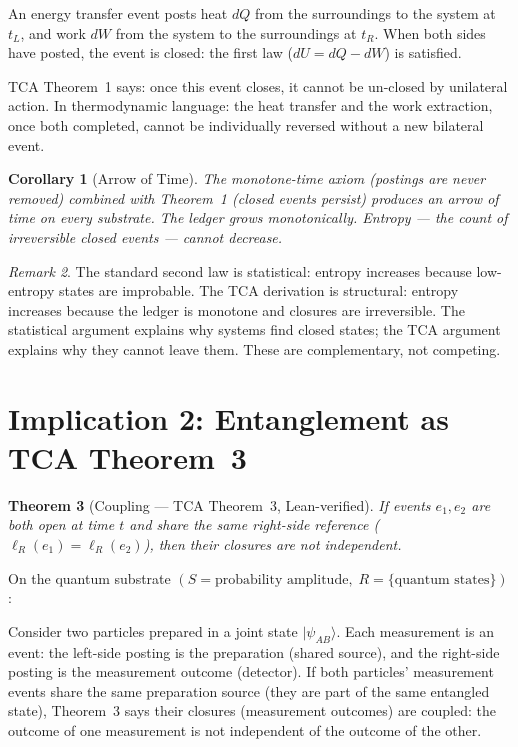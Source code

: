 \documentclass[11pt]{article}
\newtheorem{theorem}{Theorem}
\newtheorem{corollary}[theorem]{Corollary}
\theoremstyle{definition}
\theoremstyle{remark}
\newtheorem{remark}[theorem]{Remark}
\begin{document}
An energy transfer event posts heat $dQ$ from the surroundings to
the system at $t_L$, and work $dW$ from the system to the surroundings
at $t_R$. When both sides have posted, the event is closed: the
first law ($dU = dQ - dW$) is satisfied.

TCA Theorem~1 says: once this event closes, it cannot be un-closed
by unilateral action. In thermodynamic language: the heat transfer
and the work extraction, once both completed, cannot be individually
reversed without a new bilateral event.

\begin{corollary}[Arrow of Time]
The monotone-time axiom (postings are never removed) combined with
Theorem~1 (closed events persist) produces an arrow of time on
every substrate. The ledger grows monotonically. Entropy --- the
count of irreversible closed events --- cannot decrease.
\end{corollary}

\begin{remark}
The standard second law is statistical: entropy increases because
low-entropy states are improbable. The TCA derivation is structural:
entropy increases because the ledger is monotone and closures are
irreversible. The statistical argument explains why systems find
closed states; the TCA argument explains why they cannot leave them.
These are complementary, not competing.
\end{remark}

\section{Implication 2: Entanglement as TCA Theorem~3}

\begin{theorem}[Coupling --- TCA Theorem~3, Lean-verified]
If events $e_1, e_2$ are both open at time $t$ and share the same
right-side reference ($\ell_R(e_1) = \ell_R(e_2)$), then their
closures are not independent.
\end{theorem}

On the quantum substrate $(S = \text{probability amplitude},\;
R = \{\text{quantum states}\})$:

Consider two particles prepared in a joint state $|\psi_{AB}\rangle$.
Each measurement is an event: the left-side posting is the
preparation (shared source), and the right-side posting is the
measurement outcome (detector). If both particles' measurement
events share the same preparation source (they are part of the same
entangled state), Theorem~3 says their closures (measurement
outcomes) are coupled: the outcome of one measurement is not
independent of the outcome of the other.
\end{document}
